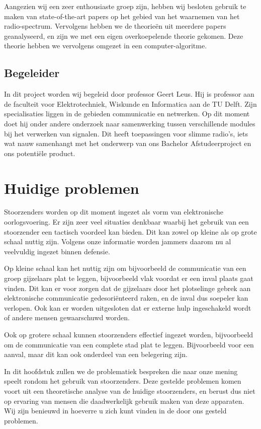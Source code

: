 \documentclass[oneside, a4paper, openany]{memoir}
\begin{document}
Aangezien wij een zeer enthousiaste groep zijn, hebben wij besloten gebruik te maken van state-of-the-art papers op het gebied van het waarnemen van het radio-spectrum. Vervolgens hebben we de theorieën uit meerdere papers geanalyseerd, en zijn we met een eigen overkoepelende theorie gekomen. Deze theorie hebben we vervolgens omgezet in een computer-algoritme.

\section{Begeleider}
In dit project worden wij begeleid door professor Geert Leus. Hij is professor aan de faculteit voor Elektrotechniek, Wiskunde en Informatica aan de TU Delft. Zijn specialisaties liggen in de gebieden communicatie en netwerken. Op dit moment doet hij onder andere onderzoek naar samenwerking tussen verschillende modules bij het verwerken van signalen. Dit heeft toepassingen voor slimme radio's, iets wat nauw samenhangt met het onderwerp van ons Bachelor Afstudeerproject en ons potentiële product.

\chapter{Huidige problemen}
Stoorzenders worden op dit moment ingezet als vorm van elektronische oorlogsvoering. Er zijn zeer veel situaties denkbaar waarbij het gebruik van een stoorzender een tactisch voordeel kan bieden. Dit kan zowel op kleine als op grote schaal nuttig zijn. Volgens onze informatie worden jammers daarom nu al veelvuldig ingezet binnen defensie.

Op kleine schaal kan het nuttig zijn om bijvoorbeeld de communicatie van een groep gijzelaars plat te leggen, bijvoorbeeld vlak voordat er een inval plaats gaat vinden. Dit kan er voor zorgen dat de gijzelaars door het plotselinge gebrek aan elektronische communicatie gedesoriënteerd raken, en de inval dus soepeler kan verlopen. Ook kan er worden uitgesloten dat er externe hulp ingeschakeld wordt of andere mensen gewaarschuwd worden.

Ook op grotere schaal kunnen stoorzenders effectief ingezet worden, bijvoorbeeld om de communicatie van een complete stad plat te leggen. Bijvoorbeeld voor een aanval, maar dit kan ook onderdeel van een belegering zijn.

In dit hoofdstuk zullen we de problematiek bespreken die naar onze mening speelt rondom het gebruik van stoorzenders. Deze gestelde problemen komen voort uit een theoretische analyse van de huidige stoorzenders, en berust dus niet op ervaring van mensen die daadwerkelijk gebruik maken van deze apparaten. Wij zijn benieuwd in hoeverre u zich kunt vinden in de door ons gesteld problemen.
\end{document}
